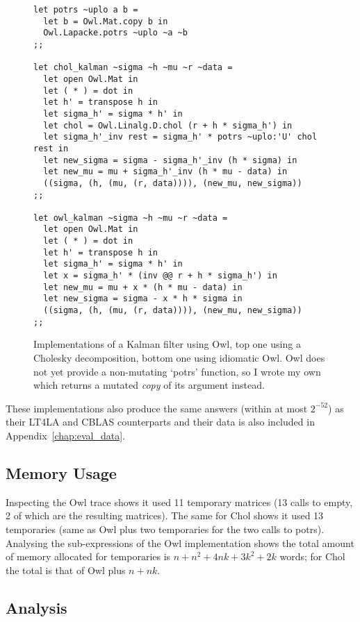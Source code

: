 \begin{figure}[tp]
    \begin{verbatim}
let potrs ~uplo a b =
  let b = Owl.Mat.copy b in
  Owl.Lapacke.potrs ~uplo ~a ~b
;;

let chol_kalman ~sigma ~h ~mu ~r ~data =
  let open Owl.Mat in
  let ( * ) = dot in
  let h' = transpose h in
  let sigma_h' = sigma * h' in
  let chol = Owl.Linalg.D.chol (r + h * sigma_h') in
  let sigma_h'_inv rest = sigma_h' * potrs ~uplo:'U' chol rest in
  let new_sigma = sigma - sigma_h'_inv (h * sigma) in
  let new_mu = mu + sigma_h'_inv (h * mu - data) in
  ((sigma, (h, (mu, (r, data)))), (new_mu, new_sigma))
;;

let owl_kalman ~sigma ~h ~mu ~r ~data =
  let open Owl.Mat in
  let ( * ) = dot in
  let h' = transpose h in
  let sigma_h' = sigma * h' in
  let x = sigma_h' * (inv @@ r + h * sigma_h') in
  let new_mu = mu + x * (h * mu - data) in
  let new_sigma = sigma - x * h * sigma in
  ((sigma, (h, (mu, (r, data)))), (new_mu, new_sigma))
;;
    \end{verbatim}
    \caption{Implementations of a Kalman filter using Owl, top one using a
        Cholesky decomposition, bottom one using idiomatic Owl. Owl does not
        yet provide a non-mutating `potrs' function, so I wrote my own which
        returns a mutated \emph{copy} of its argument
        instead.}\label{fig:chol_owl_kalman}

\end{figure}

These implementations also produce the same answers (within at most $2^{-52}$)
as their LT4LA and CBLAS counterparts and their data is also included in
Appendix~\ref{chap:eval_data}.

\subsection{Memory Usage}

Inspecting the Owl trace shows it used 11 temporary matrices (13 calls to
empty, 2 of which are the resulting matrices). The same for Chol shows it used
13 temporaries (same as Owl plus two temporaries for the two calls to potrs).
Analysing the sub-expressions of the Owl implementation shows the total amount
of memory allocated for temporaries is $n + n^2 + 4nk + 3k^2 + 2k$ words; for
Chol the total is that of Owl plus $n + nk$.

\subsection{Analysis}

